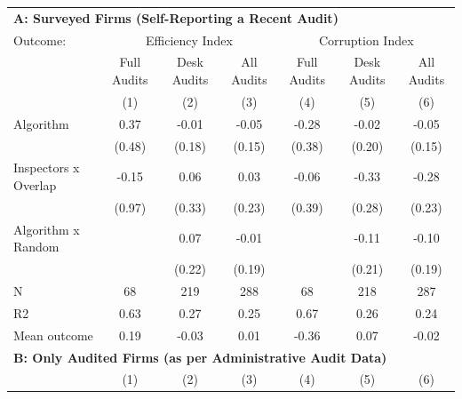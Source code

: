\begin{tabular}{lccc|ccc} \toprule
\multicolumn{7}{l}{\textbf{A: Surveyed Firms (Self-Reporting a Recent Audit)}} \\ \multicolumn{1}{l}{Outcome:} & \multicolumn{3}{c}{Efficiency Index} & \multicolumn{3}{c}{Corruption Index} \\ \multicolumn{1}{l}{} & Full Audits & Desk Audits & All Audits & Full Audits & Desk Audits & All Audits \\ \multicolumn{1}{l}{} & (1) & (2) & (3) & (4) & (5) & (6) \\ \midrule
Algorithm   &        0.37         &       -0.01         &       -0.05         &       -0.28         &       -0.02         &       -0.05         \\
            &      (0.48)         &      (0.18)         &      (0.15)         &      (0.38)         &      (0.20)         &      (0.15)         \\
\addlinespace
Inspectors x Overlap&       -0.15         &        0.06         &        0.03         &       -0.06         &       -0.33         &       -0.28         \\
            &      (0.97)         &      (0.33)         &      (0.23)         &      (0.39)         &      (0.28)         &      (0.23)         \\
\addlinespace
Algorithm x Random&                     &        0.07         &       -0.01         &                     &       -0.11         &       -0.10         \\
            &                     &      (0.22)         &      (0.19)         &                     &      (0.21)         &      (0.19)         \\
\midrule
N           &          68         &         219         &         288         &          68         &         218         &         287         \\
R2          &        0.63         &        0.27         &        0.25         &        0.67         &        0.26         &        0.24         \\
Mean outcome&        0.19         &       -0.03         &        0.01         &       -0.36         &        0.07         &       -0.02         \\

\midrule \multicolumn{7}{l}{\textbf{B: Only Audited Firms (as per Administrative Audit Data)}} \\ \multicolumn{1}{l}{} & (1) & (2) & (3) & (4) & (5) & (6) \\ \midrule


\end{tabular}
